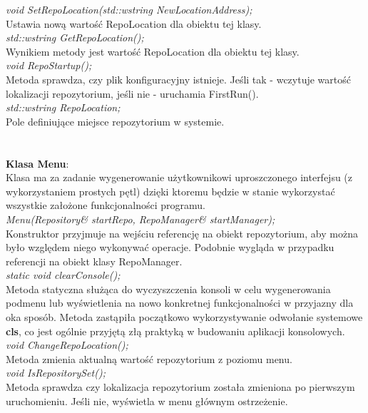 \documentclass[10pt, a4paper]{article}
\begin{document}
\textit{void SetRepoLocation(std::wstring NewLocationAddress);}\\
Ustawia nową wartość RepoLocation dla obiektu tej klasy.\\

\textit{std::wstring GetRepoLocation();}\\
Wynikiem metody jest wartość RepoLocation dla obiektu tej klasy.\\

\textit{void RepoStartup();}\\
Metoda sprawdza, czy plik konfiguracyjny istnieje. Jeśli tak - wczytuje wartość lokalizacji repozytorium, jeśli nie - uruchamia FirstRun().\\

\textit{std::wstring RepoLocation;}\\
Pole definiujące miejsce repozytorium w systemie.\\
\\\\
\textbf{Klasa Menu}:\\
Klasa ma za zadanie wygenerowanie użytkownikowi uproszczonego interfejsu (z wykorzystaniem prostych pętl) dzięki ktoremu będzie w stanie wykorzystać wszystkie założone funkcjonalności programu.\\

\textit{Menu(Repository& startRepo, RepoManager& startManager);}\\
Konstruktor przyjmuje na wejściu referencję na obiekt repozytorium, aby można było względem niego wykonywać operacje. Podobnie wygląda w przypadku referencji na obiekt klasy RepoManager.\\

\textit{static void clearConsole();}\\
Metoda statyczna służąca do wyczyszczenia konsoli w celu wygenerowania podmenu lub wyświetlenia na nowo konkretnej funkcjonalności w przyjazny dla oka sposób. Metoda zastąpiła początkowo wykorzystywanie odwołanie systemowe \textbf{cls}, co jest ogólnie przyjętą złą praktyką w budowaniu aplikacji konsolowych.\\

\textit{void ChangeRepoLocation();}\\
Metoda zmienia aktualną wartość repozytorium z poziomu menu.\\

\textit{void IsRepositorySet();}\\
Metoda sprawdza czy lokalizacja repozytorium została zmieniona po pierwszym uruchomieniu. Jeśli nie, wyświetla w menu głównym ostrzeżenie.\\
\end{document}
